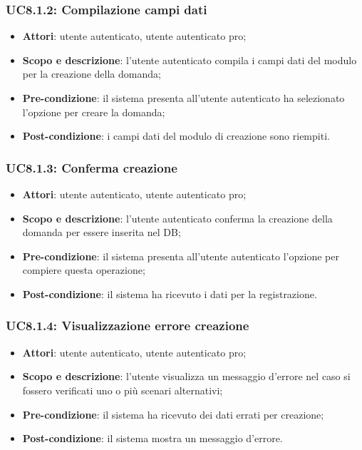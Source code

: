 	\subsubsection{UC8.1.2: Compilazione campi dati}
	\begin{itemize}
		\item
			\textbf{Attori}: utente autenticato, utente autenticato pro;
		\item
			\textbf{Scopo e descrizione}: l'utente autenticato compila i campi dati del modulo per la creazione della domanda;
		\item		
			\textbf{Pre-condizione}: il sistema presenta all'utente autenticato ha selezionato l'opzione per creare la domanda;
		\item
			\textbf{Post-condizione}: i campi dati del modulo di creazione sono riempiti.
	\end{itemize}	
	\subsubsection{UC8.1.3: Conferma creazione}
	\begin{itemize}
		\item
			\textbf{Attori}: utente autenticato, utente autenticato pro;
		\item
			\textbf{Scopo e descrizione}: l'utente autenticato conferma la creazione della domanda per essere inserita nel DB;
		\item		
			\textbf{Pre-condizione}: il sistema presenta all'utente autenticato l'opzione per compiere questa operazione;
		\item
			\textbf{Post-condizione}: il sistema ha ricevuto i dati per la registrazione.
	\end{itemize}	
	\subsubsection{UC8.1.4: Visualizzazione errore creazione}
	\begin{itemize}
		\item
			\textbf{Attori}: utente autenticato, utente autenticato pro;
		\item
			\textbf{Scopo e descrizione}: l'utente visualizza un messaggio d'errore nel caso si fossero verificati uno o più scenari alternativi;
		\item		
			\textbf{Pre-condizione}: il sistema ha ricevuto dei dati errati per creazione;
		\item
			\textbf{Post-condizione}: il sistema mostra un messaggio d'errore.
	\end{itemize}	
